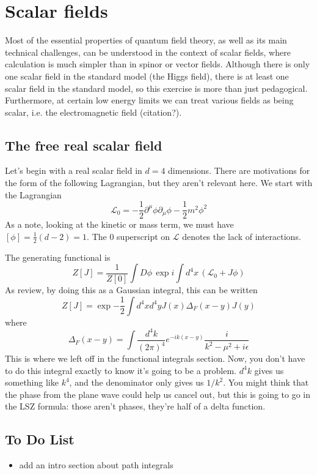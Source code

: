 \documentclass{book}
\begin{document}
\chapter{Scalar fields}
Most of the essential properties of quantum field theory, as well as its main technical challenges, can be understood in the context of scalar fields, where calculation is much simpler than in spinor or vector fields. Although there is only one scalar field in the standard model (the Higgs field), there is at least one scalar field in the standard model, so this exercise is more than just pedagogical. Furthermore, at certain low energy limits we can treat various fields as being scalar, i.e. the electromagnetic field (citation?). 

\section{The free real scalar field}
Let's begin with a real scalar field in $d = 4$ dimensions. There are motivations for the form of the following Lagrangian, but they aren't relevant here. We start with the Lagrangian
\[
\mathcal{L}_0 = - \frac{1}{2} \partial^\mu \phi \partial_\mu \phi - \frac{1}{2} m^2 \phi^2
\]
As a note, looking at the kinetic or mass term, we must have $[\phi] = \frac{1}{2}(d - 2) = 1$. The $0$ superscript on $\mathcal{L}$ denotes the lack of interactions.

The generating functional is 
\[
Z[J] = \frac{1}{Z[0]} \int D\phi \, \exp{i \int d^4x \, \left( \mathcal{L}_0 + J \phi \right)} 
\]
As review, by doing this as a Gaussian integral, this can be written
\[
Z[J] = \exp{
-\frac{1}{2} \int d^4 x d^4 y J(x) \Delta_F (x - y) J(y)
}
\]
where
\[
\Delta_F (x-y) = \int \frac{d^4 k}{(2\pi)^4} e^{-ik(x-y)} \frac{i}{k^2 - \mu^2 + i\epsilon}
\]
This is where we left off in the functional integrals section. Now, you don't have to do this integral exactly to know it's going to be a problem. $d^4 k$ gives us something like $k^4$, and the denominator only gives us $1/k^2$. You might think that the phase from the plane wave could help us cancel out, but this is going to go in the LSZ formula: those aren't phases, they're half of a delta function.
\section{To Do List}
\begin{itemize}
\item add an intro section about path integrals
\end{itemize}
\end{document}
